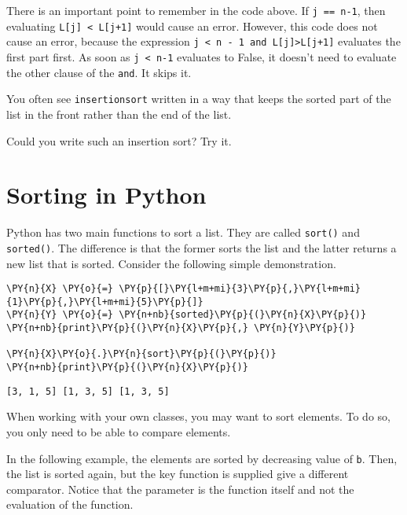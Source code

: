 There is an important point to remember in the code above.  If \texttt{j == n-1}, then evaluating \texttt{L[j] < L[j+1]} would cause an error.  However, this code does not cause an error, because the expression \texttt{j < n - 1 and L[j]>L[j+1]} evaluates the first part first.  As soon as \texttt{j < n-1} evaluates to False, it doesn't need to evaluate the other clause of the \texttt{and}.  It skips it.


You often see \texttt{insertionsort} written in a way that keeps the sorted part of the list in the front rather than the end of the list.  


Could you write such an insertion sort?  Try it.

\section{Sorting in Python}


Python has two main functions to sort a list.  They are called \texttt{sort()} and \texttt{sorted()}.  The difference is that the former sorts the list and the latter returns a new list that is sorted.  Consider the following simple demonstration.

\begin{Verbatim}[commandchars=\\\{\}]
\PY{n}{X} \PY{o}{=} \PY{p}{[}\PY{l+m+mi}{3}\PY{p}{,}\PY{l+m+mi}{1}\PY{p}{,}\PY{l+m+mi}{5}\PY{p}{]}
\PY{n}{Y} \PY{o}{=} \PY{n+nb}{sorted}\PY{p}{(}\PY{n}{X}\PY{p}{)}
\PY{n+nb}{print}\PY{p}{(}\PY{n}{X}\PY{p}{,} \PY{n}{Y}\PY{p}{)}

\PY{n}{X}\PY{o}{.}\PY{n}{sort}\PY{p}{(}\PY{p}{)}
\PY{n+nb}{print}\PY{p}{(}\PY{n}{X}\PY{p}{)}
\end{Verbatim}


\texttt{[3, 1, 5] [1, 3, 5]
[1, 3, 5]
}


When working with your own classes, you may want to sort elements.  To do so, you only need to be able to compare elements.


In the following example, the elements are sorted by decreasing value of \texttt{b}.  Then, the list is sorted again, but the key function is supplied give a different comparator.  Notice that the parameter is the function itself and not the evaluation of the function.


